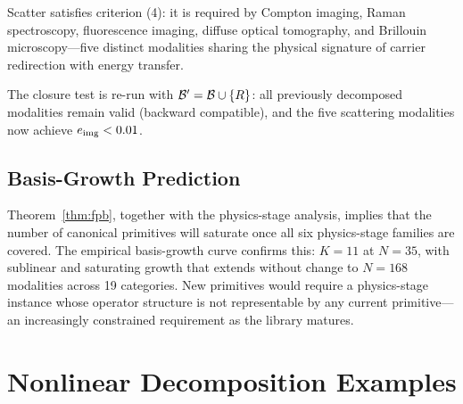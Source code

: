 \documentclass[11pt]{article}
\begin{document}
Scatter satisfies criterion (4): it is required by Compton imaging, Raman spectroscopy, fluorescence imaging, diffuse optical tomography, and Brillouin microscopy---five distinct modalities sharing the physical signature of carrier redirection with energy transfer.

The closure test is re-run with $\mathcal{B}' = \mathcal{B} \cup \{R\}$: all previously decomposed modalities remain valid (backward compatible), and the five scattering modalities now achieve $e_{\mathrm{img}} < 0.01$.

\subsection{Basis-Growth Prediction}

Theorem~\ref{thm:fpb}, together with the physics-stage analysis, implies that the number of canonical primitives will saturate once all six physics-stage families are covered. The empirical basis-growth curve confirms this: $K = 11$ at $N = 35$, with sublinear and saturating growth that extends without change to $N = 168$ modalities across 19 categories. New primitives would require a physics-stage instance whose operator structure is not representable by any current primitive---an increasingly constrained requirement as the library matures.


\section{Nonlinear Decomposition Examples}
\label{sec:universal}
\end{document}

